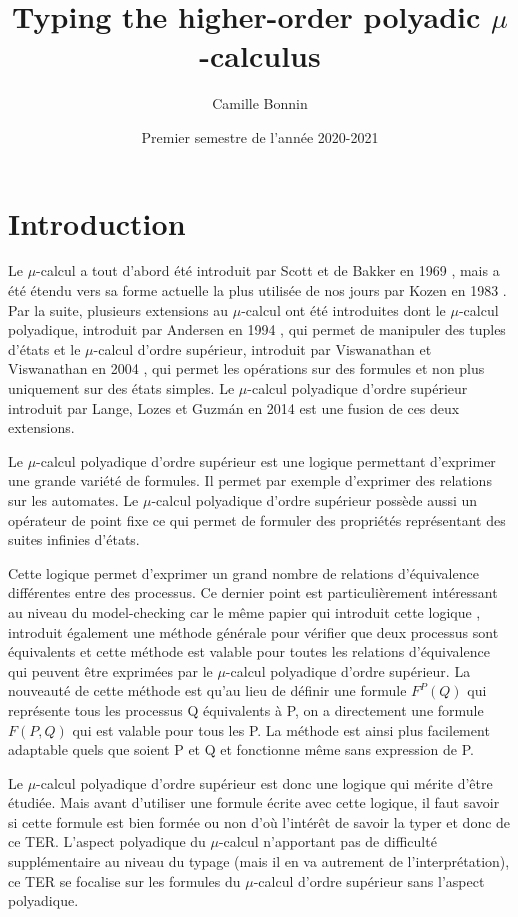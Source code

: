 \documentclass{rapport}
\title{Typing the higher-order polyadic $\mu$-calculus}
\author{Camille Bonnin}
\date{Premier semestre de l'année 2020-2021}
\theoremstyle{plain}
\theoremstyle{remark}
\theoremstyle{definition}
\begin{document}
\maketitle

\tableofcontents
\newpage

\section{Introduction\label{intro}}

Le $\mu$-calcul a tout d'abord été introduit par Scott et de Bakker en 1969 \citep{scott1969theory}, mais a été étendu vers sa forme actuelle la plus utilisée de nos jours par Kozen en 1983 \citep{kozen1983results}. Par la suite, plusieurs extensions au 
$\mu$-calcul ont été introduites dont le $\mu$-calcul polyadique, introduit par Andersen en 1994 \citep{andersen1994polyadic}, qui permet de manipuler des tuples d'états et le $\mu$-calcul d'ordre supérieur, introduit par Viswanathan et Viswanathan en 2004 \citep{viswanathan2004higher}, qui permet les opérations sur des formules et non plus uniquement sur des états simples. Le $\mu$-calcul polyadique d'ordre supérieur introduit par Lange, Lozes et Guzm{\'a}n en 2014 \citep{lange2014model} est une fusion de ces deux extensions.

Le $\mu$-calcul polyadique d'ordre supérieur est une logique permettant d'exprimer une grande variété de formules. Il permet par exemple d'exprimer des relations sur les automates. Le $\mu$-calcul polyadique d'ordre supérieur possède aussi un opérateur de point fixe ce qui permet de formuler des propriétés représentant des suites infinies d'états. 

Cette logique permet d'exprimer un grand nombre de relations d'équivalence différentes entre des processus. Ce dernier point est particulièrement intéressant au niveau du model-checking car le même papier qui introduit cette logique \citep{lange2014model}, introduit également une méthode générale pour vérifier que deux processus sont équivalents et cette méthode est valable pour toutes les relations d'équivalence qui peuvent être exprimées par le $\mu$-calcul polyadique d'ordre supérieur. La nouveauté de cette méthode est qu'au lieu de définir une formule $F^P(Q)$ qui représente tous les processus Q équivalents à P, on a directement une formule $F(P, Q)$ qui est valable pour tous les P. La méthode est ainsi plus facilement adaptable quels que soient P et Q et fonctionne même sans expression de P. 

Le $\mu$-calcul polyadique d'ordre supérieur est donc une logique qui mérite d'être étudiée. Mais avant d'utiliser une formule écrite avec cette logique, il faut savoir si cette formule est bien formée ou non d'où l'intérêt de savoir la typer et donc de ce TER. L'aspect polyadique du $\mu$-calcul n'apportant pas de difficulté supplémentaire au niveau du typage (mais il en va autrement de l'interprétation), ce TER se focalise sur les formules du $\mu$-calcul d'ordre supérieur sans l'aspect polyadique. 
\end{document}
